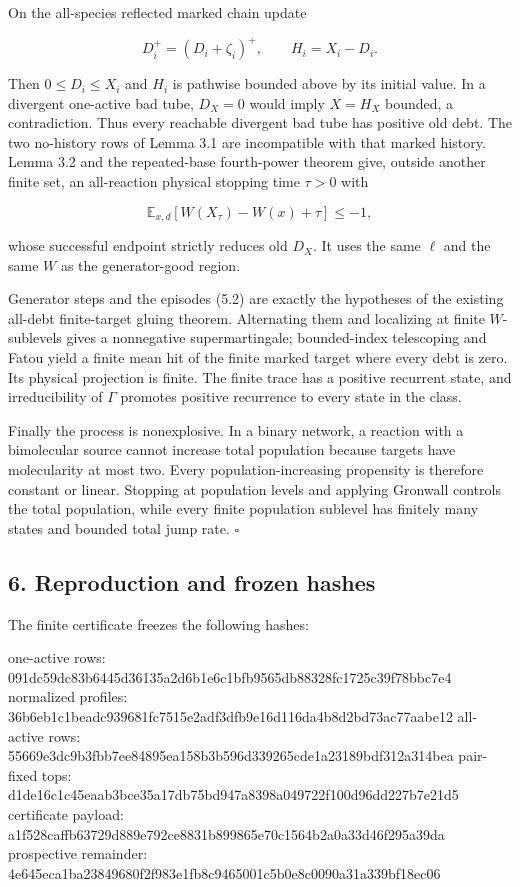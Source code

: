 On the all-species reflected marked chain update

\[
 D_i^+=(D_i+\zeta_i)^+,
 \qquad H_i=X_i-D_i.                                \tag{5.1}
\]

Then \(0\le D_i\le X_i\) and \(H_i\) is pathwise bounded above by its
initial value. In a divergent one-active bad tube, \(D_X=0\) would imply
\(X=H_X\) bounded, a contradiction. Thus every reachable divergent bad
tube has positive old debt. The two no-history rows of Lemma 3.1 are
incompatible with that marked history. Lemma 3.2 and the repeated-base
fourth-power theorem give, outside another finite set, an all-reaction
physical stopping time \(\tau>0\) with

\[
 \mathbb E_{x,d}[W(X_\tau)-W(x)+\tau]\le-1,         \tag{5.2}
\]

whose successful endpoint strictly reduces old \(D_X\). It uses the same
\(\ell\) and the same \(W\) as the generator-good region.

Generator steps and the episodes (5.2) are exactly the hypotheses of the
existing all-debt finite-target gluing theorem. Alternating them and
localizing at finite \(W\)-sublevels gives a nonnegative
supermartingale; bounded-index telescoping and Fatou yield a finite mean
hit of the finite marked target where every debt is zero. Its physical
projection is finite. The finite trace has a positive recurrent state,
and irreducibility of \(\Gamma\) promotes positive recurrence to every
state in the class.

Finally the process is nonexplosive. In a binary network, a reaction
with a bimolecular source cannot increase total population because
targets have molecularity at most two. Every population-increasing
propensity is therefore constant or linear. Stopping at population
levels and applying Gronwall controls the total population, while every
finite population sublevel has finitely many states and bounded total
jump rate. \(\square\)

\subsection{6. Reproduction and frozen
hashes}

The finite certificate freezes the following hashes:

\begin{CodeBlock}
one-active rows:       091dc59dc83b6445d36135a2d6b1e6c1bfb9565db88328fc1725c39f78bbc7e4
normalized profiles:  36b6eb1c1beadc939681fc7515e2adf3dfb9e16d116da4b8d2bd73ac77aabe12
all-active rows:       55669e3dc9b3fbb7ee84895ea158b3b596d339265cde1a23189bdf312a314bea
pair-fixed tops:       d1de16c1c45eaab3bce35a17db75bd947a8398a049722f100d96dd227b7e21d5
certificate payload:  a1f528caffb63729d889e792ce8831b899865e70c1564b2a0a33d46f295a39da
prospective remainder: 4e645eca1ba23849680f2f983e1fb8c9465001c5b0e8c0090a31a339bf18ec06
\end{CodeBlock}

